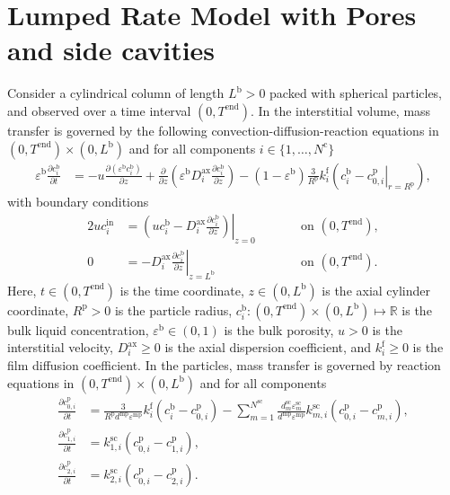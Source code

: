 \documentclass{article}
\begin{document}
\section*{Lumped Rate Model with Pores and side cavities}
Consider a cylindrical column of length $L^{\mathrm{b}} > 0$ packed with spherical particles, and observed over a time interval $(0, T^{\mathrm{end}})$.
In the interstitial volume, mass transfer is governed by the following convection-diffusion-reaction equations in $(0, T^{\mathrm{end}})\times (0, L^{\mathrm{b}})$ and for all components $i\in\{1, \dots, N^{\mathrm{c}} \}$
\begin{align}
    \varepsilon^{\mathrm{b}} \frac{\partial c^{\mathrm{b}}_{i}}{\partial t}
    &= - u \frac{\partial \left( \varepsilon^{\mathrm{b}} c^{\mathrm{b}}_{i} \right)}{\partial z}
        + \frac{\partial}{\partial z} \left( \varepsilon^{\mathrm{b}} D^{\mathrm{ax}}_{i} \frac{\partial c^{\mathrm{b}}_{i}}{\partial z} \right)
        - \left(1 - \varepsilon^{\mathrm{b}} \right) \frac{3}{R^{\mathrm{p}}} k^{\mathrm{f}}_{i} \left(c^{\mathrm{b}}_{i} - \left. c^{\mathrm{p}}_{0,i} \right|_{r = R^{\mathrm{p}}} \right),
\end{align}
with boundary conditions
\begin{alignat}{2}
    u c^{\mathrm{in}}_{i}
    &= \left.\left( u c^{\mathrm{b}}_{i} - D^{\mathrm{ax}}_{i} \frac{\partial c^{\mathrm{b}}_{i}}{\partial z}\right)\right|_{z=0}
    & & \qquad\text{on }(0, T^{\mathrm{end}}),
    \\
    0
    &= - D^{\mathrm{ax}}_{i} \left. \frac{\partial c^{\mathrm{b}}_{i}}{\partial z} \right|_{z=L^{\mathrm{b}}}
    & & \qquad\text{on }(0, T^{\mathrm{end}}).
\end{alignat}
Here, $t\in (0, T^{\mathrm{end}})$ is the time coordinate, $z\in (0, L^{\mathrm{b}})$ is the axial cylinder coordinate, $R^{\mathrm{p}}> 0$ is the particle radius, $c^{\mathrm{b}}_{i}\colon (0, T^{\mathrm{end}})\times (0, L^{\mathrm{b}}) \mapsto \mathbb{R}$ is the bulk liquid concentration, $\varepsilon^{\mathrm{b}}\in (0, 1)$ is the bulk porosity, $u> 0$ is the interstitial velocity, $D^{\mathrm{ax}}_{i}\geq 0$ is the axial dispersion coefficient, and $k^{\mathrm{f}}_{i}\geq 0$ is the film diffusion coefficient.
In the particles, mass transfer is governed by reaction equations in $(0, T^{\mathrm{end}}) \times (0, L^{\mathrm{b}})$ and for all components
\begin{align}
    \frac{\partial c^{\mathrm{p}}_{0,i}}{\partial t}
    &= \frac{3}{R^{\mathrm{p}} d^{\mathrm{mp}} \varepsilon^{\mathrm{mp}}} k^{\mathrm{f}}_{i} \left( c^{\mathrm{b}}_{i} - c^{\mathrm{p}}_{0,i} \right)
        - \sum_{m=1}^{N^{\mathrm{sc}}} \frac{d^{\mathrm{sc}}_{m} \varepsilon^{\mathrm{sc}}_{m}}{d^{\mathrm{mp}} \varepsilon^{\mathrm{mp}}} k^{\mathrm{sc}}_{m,i} \left( c^{\mathrm{p}}_{0,i} - c^{\mathrm{p}}_{m,i} \right),
    \\
    \frac{\partial c^{\mathrm{p}}_{1,i}}{\partial t}
    &= k^{\mathrm{sc}}_{1,i} \left( c^{\mathrm{p}}_{0,i} - c^{\mathrm{p}}_{1,i} \right),
    \\
    \frac{\partial c^{\mathrm{p}}_{2,i}}{\partial t}
    &= k^{\mathrm{sc}}_{2,i} \left( c^{\mathrm{p}}_{0,i} - c^{\mathrm{p}}_{2,i} \right).
\end{align}
\end{document}

